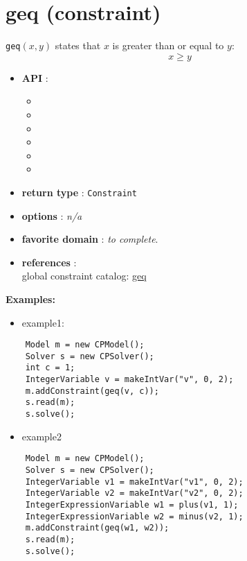 \label{geq}
\hypertarget{geq}{}

\section{geq (constraint)}\label{geq:geqconstraint}\hypertarget{geq:geqconstraint}{}
\begin{notedef}
  \texttt{geq}$(x,y)$ states that $x$ is greater than or equal to $y$:
$$x\ge y$$
\end{notedef}

\begin{itemize}
	\item \textbf{API} :
	\begin{itemize}
		\item {}
		\item {}
		\item {}
		\item {}
		\item {}
		\item {}
	\end{itemize}
	\item \textbf{return type} : \texttt{Constraint}
	\item \textbf{options} : \emph{n/a}
	\item \textbf{favorite domain} : \emph{to complete}.
	\item \textbf{references} :\\
      global constraint catalog: \href{http://www.emn.fr/x-info/sdemasse/gccat/Cgeq.html}{geq}
\end{itemize}

\textbf{Examples:}
\begin{itemize}
	\item example1:
\end{itemize}

\begin{lstlisting}
	Model m = new CPModel();
	Solver s = new CPSolver();
	int c = 1;
	IntegerVariable v = makeIntVar("v", 0, 2);
	m.addConstraint(geq(v, c));
	s.read(m);
	s.solve();
\end{lstlisting}
\begin{itemize}
	\item example2
\end{itemize}

\begin{lstlisting}
	Model m = new CPModel();
	Solver s = new CPSolver();
	IntegerVariable v1 = makeIntVar("v1", 0, 2);
	IntegerVariable v2 = makeIntVar("v2", 0, 2);
	IntegerExpressionVariable w1 = plus(v1, 1);
	IntegerExpressionVariable w2 = minus(v2, 1);
	m.addConstraint(geq(w1, w2));
	s.read(m);
	s.solve();
\end{lstlisting}
